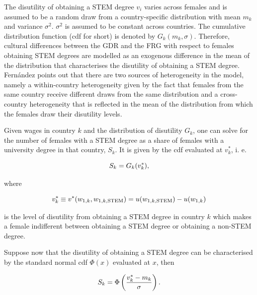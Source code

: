 \documentclass[a4paper, oneside, hyperfootnotes = false]{article}
\begin{document}
{The disutility of obtaining a STEM degree $v_{i}$ varies across females and is assumed to be a random draw from a country-specific distribution with mean $m_{k}$ and variance $\sigma^{2}$.
$\sigma^{2}$ is assumed to be constant across countries.
The cumulative distribution function (cdf for short) is denoted by $G_{k}(m_{k}, \sigma)$.
Therefore, cultural differences between the GDR and the FRG with respect to females obtaining STEM degrees are modelled as an exogenous difference in the mean of the distribution that characterises the disutility of obtaining a STEM degree.
Fernández points out that there are two sources of heterogeneity in the model, namely a within-country heterogeneity given by the fact that females from the same country receive different draws from the same distribution and a cross-country heterogeneity that is reflected in the mean of the distribution from which the females draw their disutility levels.

Given wages in country $k$ and the distribution of disutility $G_{k}$, one can solve for the number of females with a STEM degree as a share of females with a university degree in that country, $S_{k}$. It is given by the cdf evaluated at $v^{*}_{k}$, i. e.

\vspace{-8mm}

\begin{equation}
	\label{eq:share}
	S_{k} = G_{k}(v^{*}_{k})\textnormal{,}
\end{equation}

\noindent where

\vspace{-8mm}

\begin{equation*}
	\label{eq:indiff}
	v^{*}_{k} \equiv v^{*}(w_{1,k}, w_{1,k,\textnormal{STEM}}) = u(w_{1,k,\textnormal{STEM}}) - u(w_{1,k})
\end{equation*}

\noindent is the level of disutility from obtaining a STEM degree in country $k$ which makes a female indifferent between obtaining a STEM degree or obtaining a non-STEM degree.

Suppose now that the disutility of obtaining a STEM degree can be characterised by the standard normal cdf $\Phi{}(x)$ evaluated at $x$, then

\vspace{-8mm}

\begin{equation}
	\label{eq:sharecdf}
	S_{k} = \Phi\left(\frac{v^{*}_{k} - m_{k}}{\sigma}\right)\textnormal{.}
\end{equation}

}
\end{document}
